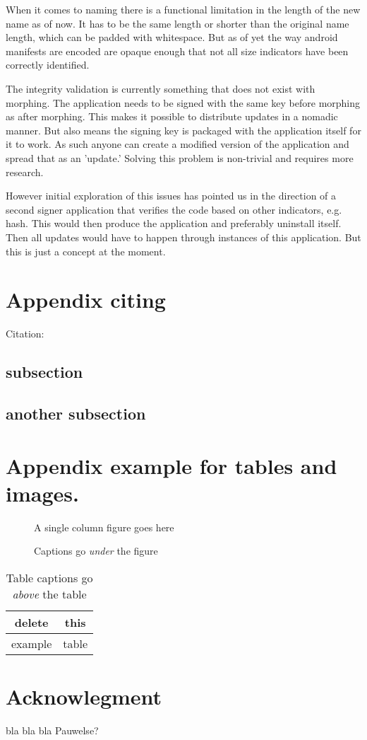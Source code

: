 \documentclass[twocolumn,english,compsoc,journal]{IEEEtran}
\providecommand{\tabularnewline}{\\}
\begin{document}
When it comes to naming there is a functional limitation in the length
of the new name as of now.
It has to be the same length or shorter than the original name length,
which can be padded with whitespace. But as of yet the way android
manifests are encoded are opaque enough that not all size indicators
have been correctly identified.

The integrity validation is currently something that does not exist with
morphing. The application needs to be signed with the same key
before morphing as after morphing. This makes it possible to distribute
updates in a nomadic manner. But also means the signing key is packaged
with the application itself for it to work. As such anyone can create a
modified version of the application and spread that as an 'update.'
Solving this problem is non-trivial and requires more research.

However initial exploration of this issues has pointed us in the direction
of a second signer application that verifies the code based on other
indicators, e.g. hash. This would then produce the application and
preferably uninstall itself. Then all updates would have to happen
through instances of this application. But this is just a concept at the
moment.


\appendices{}


\section{Appendix citing}

Citation: \cite{example:beebe_archive}

\subsection{subsection}

\subsection{another subsection}

\section{Appendix example for tables and images.}

\begin{figure}[htbp]
\begin{centering}
\textsf{A single column figure goes here}
\par\end{centering}

\protect\caption{Captions go \emph{under} the figure}
\end{figure}
\begin{table}[htbp]
\protect\caption{Table captions go \emph{above} the table}


\centering{}%
\begin{tabular}{|c|c|}
\hline 
delete & this\tabularnewline
\hline 
\hline 
example & table\tabularnewline
\hline 
\end{tabular}
\end{table}



\section*{Acknowlegment}

bla bla bla Pauwelse?



\end{document}
